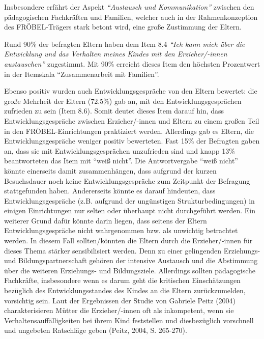 \documentclass[12pt,a4paper]{article}
\begin{document}
	Insbesondere erfährt der Aspekt \textit{"`Austausch und Kommunikation"'} zwischen den pädagogischen Fachkräften und Familien, welcher auch in der Rahmenkonzeption des FRÖBEL-Trägers stark betont wird, eine große Zustimmung der Eltern. 
	
Rund 90\% der befragten Eltern haben dem Item 8.4 \textit{"`Ich kann mich über die Entwicklung und das Verhalten meines Kindes mit den Erzieher/-innen austauschen"'} zugestimmt. Mit 90\% erreicht dieses Item den höchsten Prozentwert in der Itemskala "`Zusammenarbeit mit Familien"'.
 
	Ebenso positiv wurden auch Entwicklungsgespräche von den Eltern bewertet: die große Mehrheit der Eltern (72.5\%) gab an, mit den Entwicklungsgesprächen zufrieden zu sein (Item 8.6). Somit deutet dieses Item darauf hin, dass Entwicklungsgespräche zwischen Erzieher/-innen und Eltern zu einem großen Teil in den FRÖBEL-Einrichtungen praktiziert werden. Allerdings gab es Eltern, die Entwicklungsgespräche weniger positiv bewerteten. Fast 15\% der Befragten gaben an, dass sie mit Entwicklungsgesprächen unzufrieden sind und knapp 13\% beantworteten das Item mit "`weiß nicht"'. Die Antwortvergabe "`weiß nicht"' könnte einerseits damit zusammenhängen, dass aufgrund der kurzen Besuchsdauer noch keine Entwicklungsgespräche zum Zeitpunkt der Befragung stattgefunden haben. Andererseits könnte es darauf hindeuten, dass Entwicklungsgespräche (z.B. aufgrund der ungünstigen Strukturbedingungen) in einigen Einrichtungen nur selten oder überhaupt nicht durchgeführt werden. Ein weiterer Grund dafür könnte darin liegen, dass seitens der Eltern Entwicklungsgespräche nicht wahrgenommen bzw. als unwichtig betrachtet werden. In diesem Fall sollten/könnten die Eltern durch die Erzieher/-innen für dieses Thema stärker sensibilisiert werden. Denn zu einer gelingenden Erziehungs- und Bildungspartnerschaft gehören der intensive Austausch und die Abstimmung über die weiteren Erziehungs- und Bildungsziele. Allerdings sollten    pädagogische Fachkräfte, insbesondere wenn es darum geht die kritischen Einschätzungen bezüglich des Entwicklungsstandes des Kindes an die Eltern zurückzumelden, vorsichtig sein. Laut der Ergebnissen der Studie von Gabriele Peitz (2004) charakterisieren Mütter die Erzieher/-innen oft als inkompetent, wenn sie Verhaltensauffälligkeiten bei ihrem Kind feststellen und diesbezüglich vorschnell und ungebeten Ratschläge geben (Peitz, 2004, S. 265-270).
	
\end{document}
